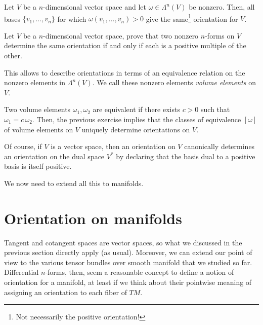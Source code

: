 \begin{lemma}\label{lemma:orient}
	Let $V$ be a $n$-dimensional vector space and let $\omega\in\Lambda^n(V)$ be nonzero.
	Then, all bases $\{v_1, \ldots, v_n\}$ for which $\omega(v_1,\ldots, v_n) > 0$ give the same\footnote{Not necessarily the positive orientation!} orientation for $V$.
\end{lemma}

\begin{exercise}
	Let $V$ be a $n$-dimensional vector space, prove that two nonzero $n$-forms on $V$ determine the same orientation if and only if each is a positive multiple of the other.
\end{exercise}

This allows to describe orientations in terms of an equivalence relation on the nonzero elements in $\Lambda^n(V)$. We call these nonzero elements \emph{volume elements} on $V$.

Two volume elements $\omega_1, \omega_2$ are equivalent if there exists $c > 0$ such that $\omega_1 = c\, \omega_2$.
Then, the previous exercise implies that the classes of equivalence $[\omega]$ of volume elements on $V$ uniquely determine orientations on $V$.

\begin{remark}
	Of course, if $V$ is a vector space, then an orientation on $V$ canonically determines an orientation on the dual space $V^*$ by declaring that the basis dual to a positive basis is itself positive.
\end{remark}

We now need to extend all this to manifolds.

\section{Orientation on manifolds}
Tangent and cotangent spaces are vector spaces, so what we discussed in the previous section directly apply (as usual).
Moreover, we can extend our point of view to the various tensor bundles over smooth manifold that we studied so far.
Differential $n$-forms, then, seem a reasonable concept to define a notion of orientation for a manifold, at least if we think about their pointwise meaning of assigning an orientation to each fiber of $TM$.

